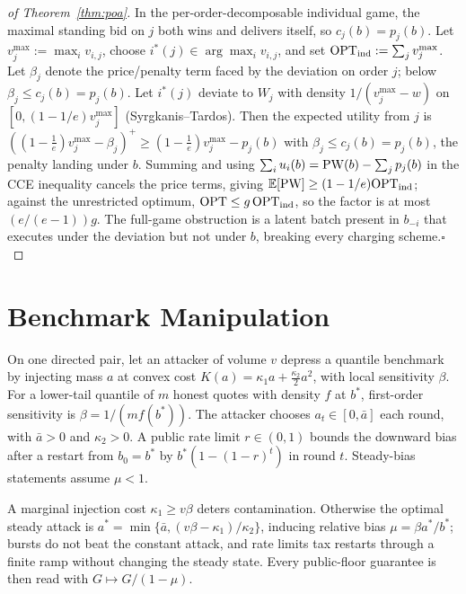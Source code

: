\begin{proof}[of Theorem~\ref{thm:poa}]
In the per-order-decomposable individual game, the maximal standing bid
on $j$ both wins and delivers itself, so $c_j(b)=p_j(b)$. Let
$v_j^{\max}:=\max_i v_{i,j}$, choose
$i^\ast(j)\in\arg\max_i v_{i,j}$, and set
$\mathrm{OPT}_{\mathrm{ind}}:=\sum_j v_j^{\max}$. Let $\beta_j$ denote the
price/penalty term faced by the deviation on order $j$; below
$\beta_j\le c_j(b)=p_j(b)$. Let
$i^\ast(j)$ deviate to $W_j$ with density $1/(v^{\max}_j-w)$ on
$[0,(1-1/e)v^{\max}_j]$ (Syrgkanis--Tardos). Then the expected utility
from $j$ is $((1-\tfrac1e)v^{\max}_j-\beta_j)^+\ge(1-\tfrac1e)
v^{\max}_j-p_j(b)$ with $\beta_j\le c_j(b)=p_j(b)$, the penalty landing
under $b$. Summing and using
$\sum_iu_i(b)=\mathrm{PW}(b)-\sum_jp_j(b)$ in the CCE inequality cancels the
price terms, giving $\mathbb{E}[\mathrm{PW}]\ge(1-1/e)\mathrm{OPT}_{\mathrm{ind}}$; against the
unrestricted optimum, $\mathrm{OPT}\le g\,\mathrm{OPT}_{\mathrm{ind}}$, so the factor is
at most $(e/(e-1))g$.
The full-game obstruction is a latent batch present in $b_{-i}$
that executes under the deviation but not under $b$, breaking every
charging scheme.\hfill$\square$
\end{proof}

\section{Benchmark Manipulation}\label{app:manipulation}

On one directed pair, let an attacker of volume $v$ depress a quantile
benchmark by injecting mass $a$ at convex cost
$K(a)=\kappa_1a+\tfrac{\kappa_2}2a^2$, with local sensitivity $\beta$.
For a lower-tail quantile of $m$ honest quotes with density $f$ at
$b^\ast$, first-order sensitivity is $\beta=1/(mf(b^\ast))$.
The attacker chooses $a_t\in[0,\bar a]$ each round, with $\bar a>0$ and
$\kappa_2>0$. A public rate limit $r\in(0,1)$ bounds the downward bias
after a restart from $b_0=b^\ast$ by $b^\ast(1-(1-r)^t)$ in round $t$.
Steady-bias statements assume $\mu<1$.

\begin{theorem}\label{thm:contam}
A marginal injection cost $\kappa_1\ge v\beta$ deters contamination.
Otherwise the optimal steady attack is
$a^\ast=\min\{\bar a,(v\beta-\kappa_1)/\kappa_2\}$, inducing relative
bias $\mu=\beta a^\ast/b^\ast$; bursts do not beat the constant attack,
and rate limits tax restarts through a finite ramp without changing the
steady state. Every public-floor guarantee is then read with
$G\mapsto G/(1-\mu)$.
\end{theorem}

